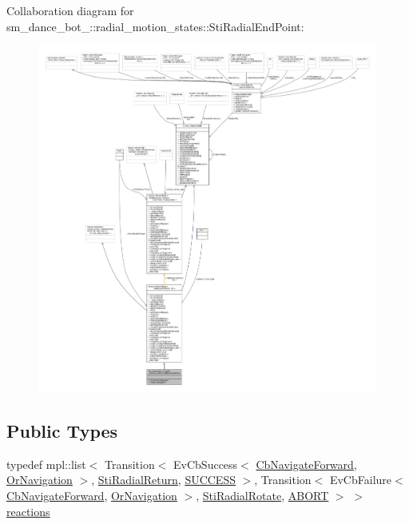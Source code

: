 Collaboration diagram for sm\+\_\+dance\+\_\+bot\+\_\+:\+:radial\+\_\+motion\+\_\+states\+:\+:Sti\+Radial\+End\+Point\+:
\nopagebreak
\begin{figure}[H]
\begin{center}
\leavevmode
\includegraphics[width=350pt]{structsm__dance__bot__2_1_1radial__motion__states_1_1StiRadialEndPoint__coll__graph}
\end{center}
\end{figure}
\subsection*{Public Types}
\begin{DoxyCompactItemize}
\item 
typedef mpl\+::list$<$ Transition$<$ Ev\+Cb\+Success$<$ \hyperlink{classcl__move__base__z_1_1CbNavigateForward}{Cb\+Navigate\+Forward}, \hyperlink{classsm__dance__bot__2_1_1OrNavigation}{Or\+Navigation} $>$, \hyperlink{structsm__dance__bot__2_1_1radial__motion__states_1_1StiRadialReturn}{Sti\+Radial\+Return}, \hyperlink{structsmacc_1_1default__transition__tags_1_1SUCCESS}{S\+U\+C\+C\+E\+SS} $>$, Transition$<$ Ev\+Cb\+Failure$<$ \hyperlink{classcl__move__base__z_1_1CbNavigateForward}{Cb\+Navigate\+Forward}, \hyperlink{classsm__dance__bot__2_1_1OrNavigation}{Or\+Navigation} $>$, \hyperlink{structsm__dance__bot__2_1_1radial__motion__states_1_1StiRadialRotate}{Sti\+Radial\+Rotate}, \hyperlink{structsmacc_1_1default__transition__tags_1_1ABORT}{A\+B\+O\+RT} $>$ $>$ \hyperlink{structsm__dance__bot__2_1_1radial__motion__states_1_1StiRadialEndPoint_ab1c4077f375f1baaec5de4b81b1ef7e7}{reactions}
\end{DoxyCompactItemize}
